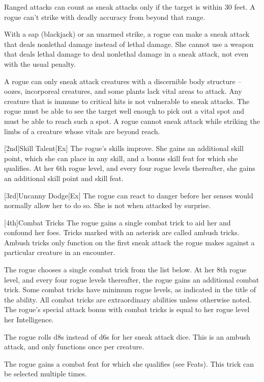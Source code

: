 \par Ranged attacks can count as sneak attacks only if the target is within 30 feet.
A rogue can't strike with deadly accuracy from beyond that range.

With a sap (blackjack) or an unarmed strike, a rogue can make a sneak attack that deals nonlethal damage instead of lethal damage.
She cannot use a weapon that deals lethal damage to deal nonlethal damage in a sneak attack, not even with the usual  penalty.

A rogue can only sneak attack creatures with a discernible body structure -- oozes, incorporeal creatures, and some plants lack vital areas to attack.
Any creature that is immune to critical hits is not vulnerable to sneak attacks.
The rogue must be able to see the target well enough to pick out a vital spot and must be able to reach such a spot.
A rogue cannot sneak attack while striking the limbs of a creature whose vitals are beyond reach.

[2nd]{Skill Talent}[Ex]
The rogue's skills improve.
She gains an additional skill point, which she can place in any skill, and a bonus skill feat for which she qualifies.
At her 6th rogue level, and every four rogue levels thereafter, she gains an additional skill point and skill feat.

[3rd]{Uncanny Dodge}[Ex]
The rogue can react to danger before her senses would normally allow her to do so.
She is not \unaware when attacked by surprise.

[4th]{Combat Tricks}
The rogue gains a single combat trick to aid her and confound her foes.
Tricks marked with an asterisk are called ambush tricks.
Ambush tricks only function on the first sneak attack the rogue makes against a particular creature in an encounter.

The rogue chooses a single combat trick from the list below.
At her 8th rogue level, and every four rogue levels thereafter, the rogue gains an additional combat trick.
Some combat tricks have minimum rogue levels, as indicated in the title of the ability.
All combat tricks are extraordinary abilities unless otherwise noted.
The rogue's special attack bonus with combat tricks is equal to her rogue level \add her Intelligence.

The rogue rolls d8s instead of d6s for her sneak attack dice.
This is an ambush attack, and only functions once per creature.

The rogue gains a combat feat for which she qualifies (see Feats).
This trick can be selected multiple times.

